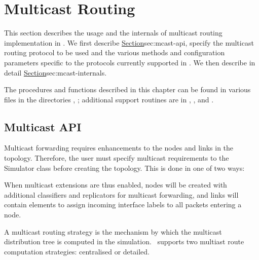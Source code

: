 \chapter{Multicast Routing}
\label{chap:multicast}

This section describes the usage and the internals of multicast
routing implementation in \ns.
We first describe 
\href{the user interface to enable multicast routing}{Section}{sec:mcast-api},
specify the multicast routing protocol to be used and the
various methods and configuration parameters specific to the
protocols currently supported in \ns.
We then describe in detail 
\href{the internals and the architecture of the
multicast routing implementation in \ns}{Section}{sec:mcast-internals}.

The procedures and functions described in this chapter can be found in
various files in the directories , ;
additional support routines
are in ,
, and .

\section{Multicast API}
\label{sec:mcast-api}

Multicast forwarding requires enhancements
to the nodes and links in the topology.
Therefore, the user must specify multicast requirements
to the Simulator class before creating the topology.
This is done in one of two ways:
When multicast extensions are thus enabled, nodes will be created with
additional classifiers and replicators for multicast forwarding, and
links will contain elements to assign incoming interface labels to all
packets entering a node.

A multicast routing strategy is the mechanism by which
the multicast distribution tree is computed in the simulation.
\ns\ supports two multiast route computation strategies:
	centralised or detailed.

